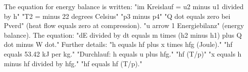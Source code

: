The equation for energy balance is written:  
"im Kreislauf = u2 minus u1 divided by h"  
"T2 = minus 22 degrees Celsius"  
"p3 minus p4"  
"Q dot equals zero bei Pverd" (heat flow equals zero at compression).  
"u arrow 1 Energiebilanz" (energy balance).  
The equation:  
"dE divided by dt equals m times (h2 minus h1) plus Q dot minus W dot."  
Further details:  
"h equals hf plus x times hfg (Joule)."  
"hf equals 53.42 kJ per kg."  
"Durchlauf: h equals u plus hfg."  
"hf (T/p)"  
"x equals h minus hf divided by hfg."  
"hf equals hf (T/p)."